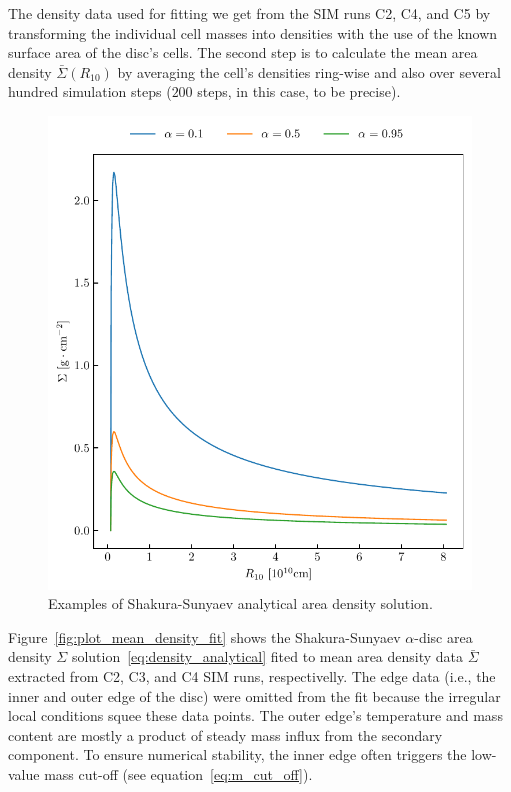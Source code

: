     The density data used for fitting we get from the SIM runs C2, C4, and C5 by transforming the individual cell masses into densities with the use of the known surface area of the disc's cells. The second step is to calculate the mean area density $\bar{\Sigma}(R_{10})$ by averaging the cell's densities ring-wise and also over several hundred simulation steps ($200$ steps, in this case, to be precise). 

    \begin{figure}[H]
    \begin{center}
        \includegraphics[width=1.0\textwidth]{img/plot_density_analytical.pdf}
    \end{center}
    \caption{Examples of Shakura-Sunyaev analytical area density solution.}
    \label{fig:plot_density_analytical}
    \end{figure}

    Figure~\ref{fig:plot_mean_density_fit} shows the Shakura-Sunyaev $\alpha$-disc area density $\Sigma$ solution~\eqref{eq:density_analytical} fited to mean area density data $\bar{\Sigma}$ extracted from C2, C3, and C4 SIM runs, respectivelly. The edge data (i.e., the inner and outer edge of the disc) were omitted from the fit because the irregular local conditions squee these data points. The outer edge's temperature and mass content are mostly a product of steady mass influx from the secondary component. To ensure numerical stability, the inner edge often triggers the low-value mass cut-off (see equation~\eqref{eq:m_cut_off}). 

